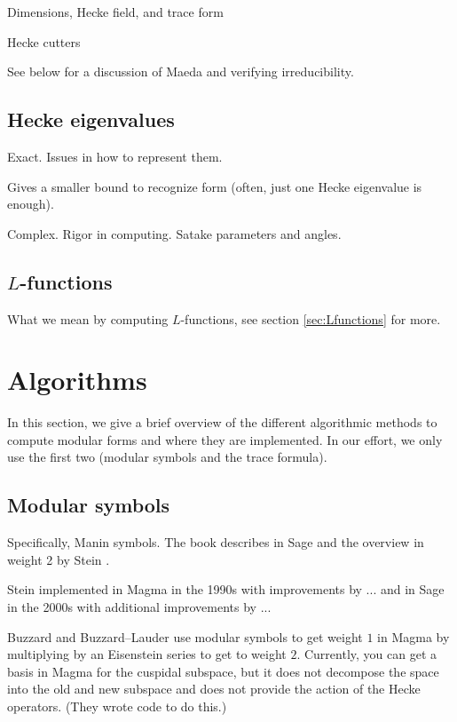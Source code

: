 \documentclass[11pt]{amsart}
\numberwithin{equation}{subsection}
\theoremstyle{plain}
\theoremstyle{definition}
\begin{document}
Dimensions, Hecke field, and trace form

Hecke cutters

See below for a discussion of Maeda and verifying irreducibility.

\subsection{Hecke eigenvalues}

Exact.  Issues in how to represent them.

Gives a smaller bound to recognize form (often, just one Hecke eigenvalue is enough).

Complex.  Rigor in computing.  Satake parameters and angles.

\subsection{$L$-functions}

What we mean by computing $L$-functions, see section \ref{sec:Lfunctions} for more.

\section{Algorithms} \label{sec:algs}

In this section, we give a brief overview of the different algorithmic methods to compute modular forms and where they are implemented.  In our effort, we only use the first two (modular symbols and the trace formula).  

\subsection{Modular symbols}

Specifically, Manin symbols.  The book \cite{Stein} describes in Sage and the overview in weight 2 by Stein \cite{Stein2}.

Stein implemented in Magma in the 1990s with improvements by ...  and in Sage in the 2000s with additional improvements by ...

Buzzard and Buzzard--Lauder use modular symbols to get weight $1$ in Magma by multiplying by an Eisenstein series to get to weight $2$.  Currently, you can get a basis in Magma for the cuspidal subspace, but it does not decompose the space into the old and new subspace and does not provide the action of the Hecke operators.  (They wrote code to do this.)  
\end{document}
